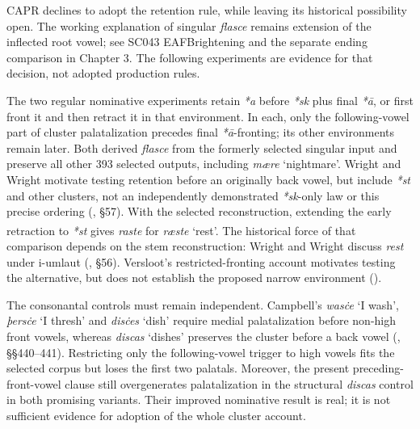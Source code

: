 \documentclass[
  british,
  a4paper,
]{article}
\providecommand{\Pred}[1]{\textsuperscript{\dag}\emph{#1}}
\begin{document}
CAPR declines to adopt the retention rule, while leaving its historical
possibility open. The working explanation of singular \emph{flasce}
remains extension of the inflected root vowel; see SC043 EAFBrightening
and the separate ending comparison in Chapter 3. The following
experiments are evidence for that decision, not adopted production
rules.

The two regular nominative experiments retain \emph{*a} before
\emph{*sk} plus final \emph{*ā}, or first front it and then retract it
in that environment. In each, only the following-vowel part of cluster
palatalization precedes final \emph{*ā}-fronting; its other environments
remain later. Both derived \emph{flasce} from the formerly selected
singular input and preserve all other 393 selected outputs, including
\emph{mære} `nightmare'. Wright and Wright motivate testing retention
before an originally back vowel, but include \emph{*st} and other
clusters, not an independently demonstrated \emph{*sk}-only law or this
precise ordering (, §57). With the selected reconstruction, extending the early
retraction to \emph{*st} gives \Pred{raste} for \emph{ræste} `rest'. The
historical force of that comparison depends on the stem reconstruction:
Wright and Wright discuss \emph{rest} under i-umlaut
(, §56). Versloot's
restricted-fronting account motivates testing the alternative, but does
not establish the proposed narrow environment
().

The consonantal controls must remain independent. Campbell's
\emph{wasċe} `I wash', \emph{þersċe} `I thresh' and \emph{disċes} `dish'
require medial palatalization before non-high front vowels, whereas
\emph{discas} `dishes' preserves the cluster before a back vowel
(, §§440--441).
Restricting only the following-vowel trigger to high vowels fits the
selected corpus but loses the first two palatals. Moreover, the present
preceding-front-vowel clause still overgenerates palatalization in the
structural \emph{discas} control in both promising variants. Their
improved nominative result is real; it is not sufficient evidence for
adoption of the whole cluster account.
\end{document}
